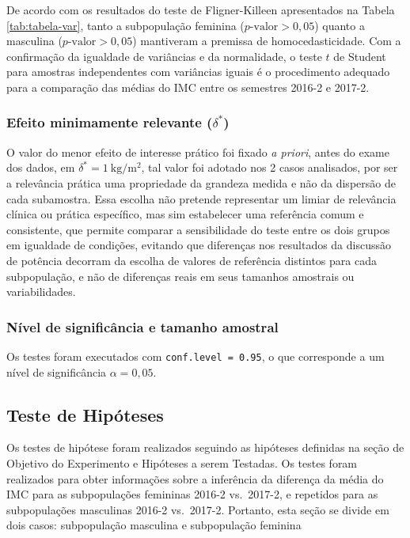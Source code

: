 \documentclass[
]{article}
\begin{document}
De acordo com os resultados do teste de Fligner-Killeen apresentados na Tabela \ref{tab:tabela-var}, tanto a subpopulação feminina (\(p\text{-valor} > 0{,}05\)) quanto a masculina (\(p\text{-valor} > 0{,}05\)) mantiveram a premissa de homocedasticidade. Com a confirmação da igualdade de variâncias e da normalidade, o teste \(t\) de Student para amostras independentes com variâncias iguais é o procedimento adequado para a comparação das médias do IMC entre os semestres 2016-2 e 2017-2.

\subsubsection{\texorpdfstring{Efeito minimamente relevante (\(\delta^*\))}{Efeito minimamente relevante (\textbackslash delta\^{}*)}}\label{efeito-minimamente-relevante-delta}

O valor do menor efeito de interesse prático foi fixado \emph{a priori}, antes do exame dos dados,
em \(\delta^* = 1\ \mathrm{kg/m^2}\), tal valor foi adotado nos 2 casos analisados,
por ser a relevância prática uma propriedade da grandeza medida e não da dispersão de cada
subamostra. Essa escolha não pretende representar um limiar de relevância clínica ou prática específico, mas sim estabelecer uma referência comum e consistente, que permite comparar a sensibilidade do teste entre os dois grupos em igualdade de condições, evitando que diferenças nos resultados da discussão de potência decorram da escolha de valores de referência distintos para cada subpopulação, e não de diferenças reais em seus tamanhos amostrais ou variabilidades.

\subsubsection{Nível de significância e tamanho amostral}\label{nuxedvel-de-significuxe2ncia-e-tamanho-amostral}

Os testes foram executados com \texttt{conf.level\ =\ 0.95}, o que corresponde a um nível de
significância \(\alpha = 0{,}05\).

\subsection{Teste de Hipóteses}\label{teste-de-hipuxf3teses}

Os testes de hipótese foram realizados seguindo as hipóteses definidas na seção de Objetivo do Experimento e Hipóteses a serem Testadas. Os testes foram realizados para obter informações sobre a inferência da diferença da média do IMC para as subpopulações femininas 2016-2 vs.~2017-2, e repetidos para as subpopulações masculinas 2016-2 vs.~2017-2. Portanto, esta seção se divide em dois casos: subpopulação masculina e subpopulação feminina
\end{document}
